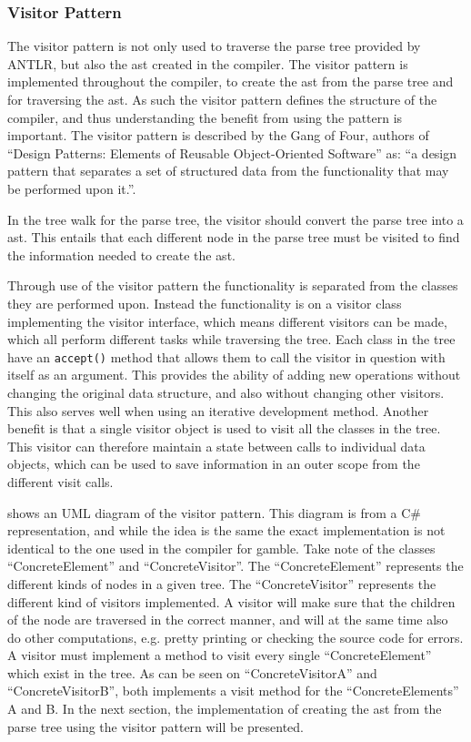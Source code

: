 \subsubsection*{Visitor Pattern}\label{subs:visit}
The visitor pattern is not only used to traverse the parse tree provided by ANTLR, but also the \acrshort{ast} created in the compiler.
The visitor pattern is implemented throughout the compiler, to create the \acrshort{ast} from the parse tree and for traversing the \acrshort{ast}.
As such the visitor pattern defines the structure of the compiler, and thus understanding the benefit from using the pattern is important.
The visitor pattern is described by the Gang of Four, authors of ``Design Patterns: Elements of Reusable Object-Oriented Software'' as:
``a design pattern that separates a set of structured data from the functionality that may be performed upon it.''. \citep{GOF}

In the tree walk for the parse tree, the visitor should convert the parse tree into a \acrshort{ast}.
This entails that each different node in the parse tree must be visited to find the information needed to create the \acrshort{ast}.

Through use of the visitor pattern the functionality is separated from the classes they are performed upon. 
Instead the functionality is on a visitor class implementing the visitor interface, which means different visitors can be made, which all perform different tasks while traversing the tree. 
Each class in the tree have an \texttt{accept()} method that allows them to call the visitor in question with itself as an argument.
This provides the ability of adding new operations without changing the original data structure, and also without changing other visitors.
This also serves well when using an iterative development method.
Another benefit is that a single visitor object is used to visit all the classes in the tree.
This visitor can therefore maintain a state between calls to individual data objects, which can be used to save information in an outer scope from the different visit calls.

 shows an UML diagram of the visitor pattern.
This diagram is from a C\# representation, and while the idea is the same the exact implementation is not identical to the one used in the compiler for \gls{gamble}.
Take note of the classes ``ConcreteElement'' and ``ConcreteVisitor''.
The ``ConcreteElement'' represents the different kinds of nodes in a given tree.
The ``ConcreteVisitor'' represents the different kind of visitors implemented.
A visitor will make sure that the children of the node are traversed in the correct manner, and will at the same time also do other computations, e.g. pretty printing or checking the source code for errors.
A visitor must implement a method to visit every single ``ConcreteElement'' which exist in the tree.
As can be seen on  ``ConcreteVisitorA'' and ``ConcreteVisitorB'', both implements a visit method for the ``ConcreteElements'' A and B.
In the next section, the implementation of creating the \acrshort{ast} from the parse tree using the visitor pattern will be presented.

